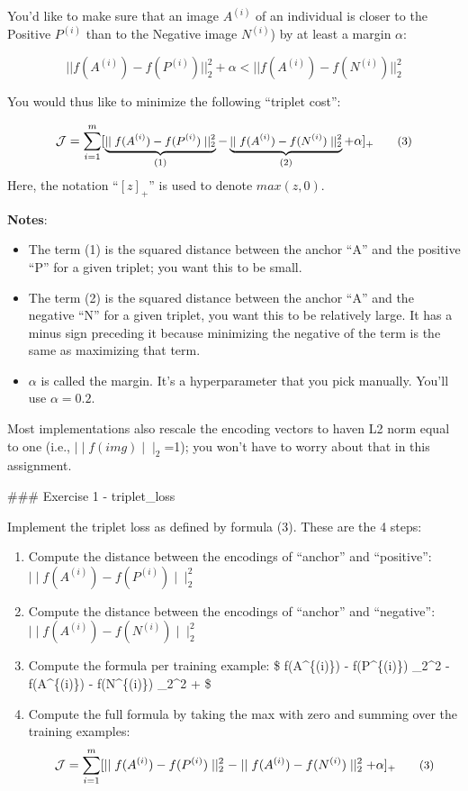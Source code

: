 \documentclass[11pt]{article}
\providecommand{\tightlist}{%
      \setlength{\itemsep}{0pt}\setlength{\parskip}{0pt}}
\begin{document}
You'd like to make sure that an image \(A^{(i)}\) of an individual is
closer to the Positive \(P^{(i)}\) than to the Negative image
\(N^{(i)}\)) by at least a margin \(\alpha\):

\[
|| f\left(A^{(i)}\right)-f\left(P^{(i)}\right)||_{2}^{2}+\alpha<|| f\left(A^{(i)}\right)-f\left(N^{(i)}\right)||_{2}^{2}
\]

You would thus like to minimize the following ``triplet cost'':

\[\mathcal{J} = \sum^{m}_{i=1} \large[ \small \underbrace{\mid \mid f(A^{(i)}) - f(P^{(i)}) \mid \mid_2^2}_\text{(1)} - \underbrace{\mid \mid f(A^{(i)}) - f(N^{(i)}) \mid \mid_2^2}_\text{(2)} + \alpha \large ] \small_+ \tag{3}\]
Here, the notation ``\([z]_+\)'' is used to denote \(max(z,0)\).

\textbf{Notes}:

\begin{itemize}
\tightlist
\item
  The term (1) is the squared distance between the anchor ``A'' and the
  positive ``P'' for a given triplet; you want this to be small.
\item
  The term (2) is the squared distance between the anchor ``A'' and the
  negative ``N'' for a given triplet, you want this to be relatively
  large. It has a minus sign preceding it because minimizing the
  negative of the term is the same as maximizing that term.
\item
  \(\alpha\) is called the margin. It's a hyperparameter that you pick
  manually. You'll use \(\alpha = 0.2\).
\end{itemize}

Most implementations also rescale the encoding vectors to haven L2 norm
equal to one (i.e., \(\mid \mid f(img)\mid \mid_2\)=1); you won't have
to worry about that in this assignment.

\#\#\# Exercise 1 - triplet\_loss

Implement the triplet loss as defined by formula (3). These are the 4
steps:

\begin{enumerate}
\def\labelenumi{\arabic{enumi}.}
\tightlist
\item
  Compute the distance between the encodings of ``anchor'' and
  ``positive'': \(\mid \mid f(A^{(i)}) - f(P^{(i)}) \mid \mid_2^2\)
\item
  Compute the distance between the encodings of ``anchor'' and
  ``negative'': \(\mid \mid f(A^{(i)}) - f(N^{(i)}) \mid \mid_2^2\)
\item
  Compute the formula per training example: \$ \mid \mid f(A\^{}\{(i)\})
  - f(P\^{}\{(i)\}) \mid \mid\_2\^{}2 - \mid \mid f(A\^{}\{(i)\}) -
  f(N\^{}\{(i)\}) \mid \mid\_2\^{}2 + \alpha\$
\item
  Compute the full formula by taking the max with zero and summing over
  the training
  examples:\[\mathcal{J} = \sum^{m}_{i=1} \large[ \small \mid \mid f(A^{(i)}) - f(P^{(i)}) \mid \mid_2^2 - \mid \mid f(A^{(i)}) - f(N^{(i)}) \mid \mid_2^2+ \alpha \large ] \small_+ \tag{3}\]
\end{enumerate}
\end{document}
